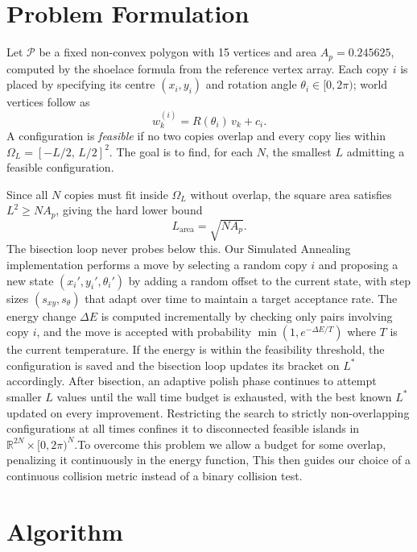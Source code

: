 \documentclass[10pt]{article}
\begin{document}
\section{Problem Formulation}
\label{sec:formulation}

Let $\mathcal{P}$ be a fixed non-convex polygon with 15 vertices and
area $A_p = 0.245625$, computed by the shoelace formula from the
reference vertex array. Each copy $i$ is placed by specifying its
centre $(x_i, y_i)$ and rotation angle $\theta_i \in [0, 2\pi)$;
world vertices follow as $$w_k^{(i)} = R(\theta_i)\,v_k + c_i.$$ A
configuration is \emph{feasible} if no two copies overlap and every
copy lies within $\Omega_L = [-L/2,\,L/2]^2$. The goal is to find,
for each $N$, the smallest $L$ admitting a feasible configuration.

Since all $N$ copies must fit inside $\Omega_L$ without overlap, the
square area satisfies $L^2 \geq N A_p$, giving the hard lower bound
$$L_{\mathrm{area}} = \sqrt{N A_p}.$$ The bisection loop never probes
below this.
 Our Simulated Annealing implementation
performs a move by selecting a random copy $i$ and proposing a new state
$(x_i', y_i', \theta_i')$ by adding a random offset to the current state,
 with step sizes $(s_{xy}, s_\theta)$ that adapt over time to
  maintain a target acceptance rate.
   The energy change $\Delta E$ is computed incrementally by 
   checking only pairs involving copy $i$, and the move 
   is accepted with probability $\min(1, e^{-\Delta E/T})$ where $T$ is
    the current temperature. If the energy is within the 
feasibility threshold, the configuration is saved
and the bisection loop updates its bracket on $L^*$ accordingly. After
bisection, an adaptive polish phase continues to attempt smaller $L$ values until the wall time budget is exhausted,
 with the best known $L^*$ updated on every improvement.
 Restricting the search to strictly non-overlapping
configurations at all times confines it to disconnected feasible
islands in $\mathbb{R}^{2N} \times [0, 2\pi)^N$.To overcome this 
problem we allow a budget for some overlap, penalizing it continuously in the energy function,
This then guides our choice of a continuous collision metric 
instead of a binary collision test.

\section{Algorithm}
\label{sec:algorithm}
\end{document}
